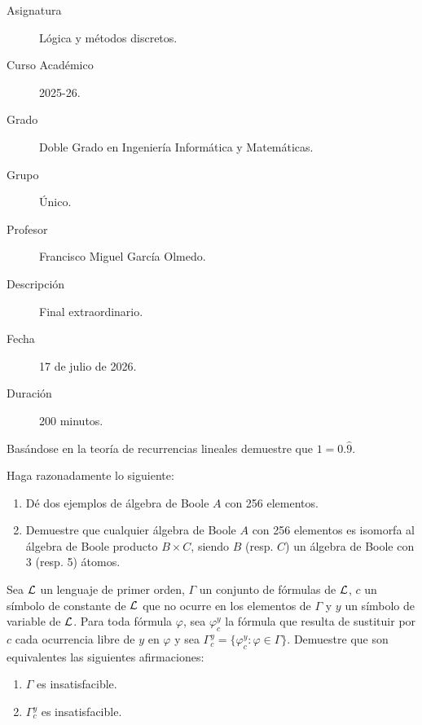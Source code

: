 \documentclass[12pt]{article}
\begin{document}

    
    

    \begin{description}
        \item[Asignatura] Lógica y métodos discretos.
        \item[Curso Académico] 2025-26.
        \item[Grado] Doble Grado en Ingeniería Informática y Matemáticas.
        \item[Grupo] Único.
        \item[Profesor] Francisco Miguel García Olmedo.
        \item[Descripción] Final extraordinario.
        \item[Fecha] 17 de julio de 2026.
        \item[Duración] 200 minutos.
    \end{description}
    \newpage
    
    \begin{ejercicio} Basándose en la teoría de recurrencias lineales demuestre que $1=0.\hat{9}$.
    \end{ejercicio}

    
    \begin{ejercicio} Haga razonadamente lo siguiente:
        \begin{enumerate}[label=\alph*)]
            \item Dé dos ejemplos de álgebra de Boole $A$ con 256 elementos.
            \item Demuestre que cualquier álgebra de Boole $A$ con 256 elementos es isomorfa al álgebra de Boole producto $B \times C$, siendo $B$ (resp. $C$) un álgebra de Boole con 3 (resp. 5) átomos.
        \end{enumerate}
    \end{ejercicio}

    
    \begin{ejercicio} Sea $\mathcal{L}$ un lenguaje de primer orden, $\Gamma$ un conjunto de fórmulas de $\mathcal{L}$, $c$ un símbolo de constante de $\mathcal{L}$ que no ocurre en los elementos de $\Gamma$ y $y$ un símbolo de variable de $\mathcal{L}$. Para toda fórmula $\varphi$, sea $\varphi_c^y$ la fórmula que resulta de sustituir por $c$ cada ocurrencia libre de $y$ en $\varphi$ y sea $\Gamma_c^y = \{\varphi_c^y : \varphi \in \Gamma\}$. Demuestre que son equivalentes las siguientes afirmaciones:
    \begin{enumerate}[label=\alph*)]
        \item $\Gamma$ es insatisfacible.
        \item $\Gamma_c^y$ es insatisfacible.
    \end{enumerate}
    \end{ejercicio}
\end{document}
